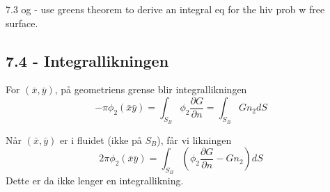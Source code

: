 7.3 og 
- use greens theorem to derive an integral eq for the hiv prob w free surface.

\subsection{7.4 - Integrallikningen}
For $(\bar{x},\bar{y})$, på geometriens grense blir integrallikningen
\begin{equation}
    -\pi \phi_2(\bar{x}\bar{y})  = \int_{S_B}  \phi_2  \frac{\partial G }{\partial n} = \int_{S_B}  G n_2 dS \tag{142}
\end{equation}

Når $(\bar{x},\bar{y})$ er i fluidet (ikke på $S_B$), får vi likningen
\begin{equation}
    2\pi \phi_2(\bar{x}\bar{y})  = \int_{S_B}  ( \phi_2  \frac{\partial G }{\partial n}-G n_2 )dS \tag{143}
\end{equation}
Dette er da ikke lenger en integrallikning.